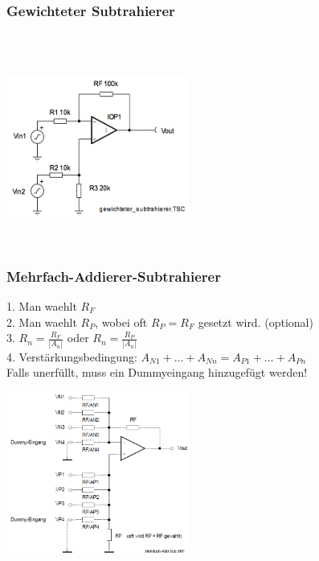 		\subsubsection{Gewichteter Subtrahierer }
			\begin{minipage}[b]{12cm}
            	\hspace*{10mm}\\
            	\hspace*{10mm}\\
            	\hspace*{10mm}
            \end{minipage}
			\begin{minipage}{6cm}
            	\includegraphics[width=6cm]{./bilder/gewichtsub.png}
            \end{minipage}\\


		\subsubsection{Mehrfach-Addierer-Subtrahierer } 		
		\begin{minipage}[b]{12cm}
		1. Man waehlt $R_{F}$\\
		2. Man waehlt $R_{P}$, wobei oft $R_{P}=R_{F}$ gesetzt wird. (optional)\\
		3. $R_{n}=\frac{R_{F}}{\left|A_{n}\right|}$ oder
			$R_{n}=\frac{R_{P}}{\left|A_{n}\right|}$\\ 
		4. Verstärkungsbedingung: $A_{N1} +
		\ldots + A_{Nn} = A_{P1} + \ldots + A_{Pn}$ \\Falls unerfüllt, muss ein Dummyeingang hinzugefügt werden!
		\end{minipage}
		\begin{minipage}{6cm}
          	\includegraphics[width=6cm]{./bilder/mehrfach-addierer-subtrahierer.png} 
        \end{minipage}\\

